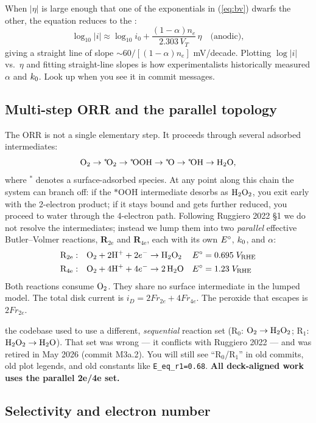 \documentclass[11pt]{article}
\begin{document}
When $|\eta|$ is large enough that one of the exponentials in
(\ref{eq:bv}) dwarfs the other, the equation reduces to the
:
\[
  \log_{10}|i| \approx \log_{10} i_0 + \frac{(1-\alpha) n_e}{2.303\,V_T}\,\eta
  \quad\text{(anodic)},
\]
giving a straight line of slope $\sim 60/[(1-\alpha) n_e]$ mV/decade.
Plotting $\log|i|$ vs.\ $\eta$ and fitting straight-line slopes is
how experimentalists historically measured $\alpha$ and $k_0$.
Look up  when you see it in commit messages.

\subsection{Multi-step ORR and the parallel topology}

The ORR is not a single elementary step. It proceeds through
several adsorbed intermediates:
\[
  \mathrm{O_2} \to {}^*\!\mathrm{O_2} \to {}^*\!\mathrm{OOH} \to {}^*\!\mathrm{O}
  \to {}^*\!\mathrm{OH} \to \mathrm{H_2O},
\]
where ${}^*$ denotes a surface-adsorbed species. At any point along
this chain the system can branch off: if the $*\!\mathrm{OOH}$
intermediate desorbs as $\mathrm{H_2O_2}$, you exit early with the
2-electron product; if it stays bound and gets further reduced, you
proceed to water through the 4-electron path. Following Ruggiero
2022 \S 1 we do not resolve the intermediates; instead we lump them
into two \emph{parallel} effective Butler--Volmer reactions,
\textbf{R$_{\text{2e}}$} and \textbf{R$_{\text{4e}}$}, each with
its own $E^{\circ}$, $k_0$, and $\alpha$:
\begin{align}
  \mathrm{R_{2e}}: && \mathrm{O_2} + 2\mathrm{H^+} + 2 e^- &\to \mathrm{H_2O_2} & E^{\circ} &= 0.695\;V_{\mathrm{RHE}} \\
  \mathrm{R_{4e}}: && \mathrm{O_2} + 4\mathrm{H^+} + 4 e^- &\to 2\,\mathrm{H_2O} & E^{\circ} &= 1.23\;V_{\mathrm{RHE}}
\end{align}
Both reactions consume $\mathrm{O_2}$. They share no surface intermediate
in the lumped model. The total disk current is
$i_D = 2F r_{2e} + 4F r_{4e}$. The peroxide that escapes is
$2F r_{2e}$.

 the codebase used to use a different,
\emph{sequential} reaction set (R$_0$: $\mathrm{O_2} \to \mathrm{H_2O_2}$;
R$_1$: $\mathrm{H_2O_2} \to \mathrm{H_2O}$). That set was wrong --- it
conflicts with Ruggiero 2022 --- and was retired in May 2026
(commit M3a.2). You will still see ``R$_0$/R$_1$'' in old commits,
old plot legends, and old constants like \texttt{E\_eq\_r1=0.68}.
\textbf{All deck-aligned work uses the parallel 2e/4e set.}

\subsection{Selectivity and electron number}
\end{document}
